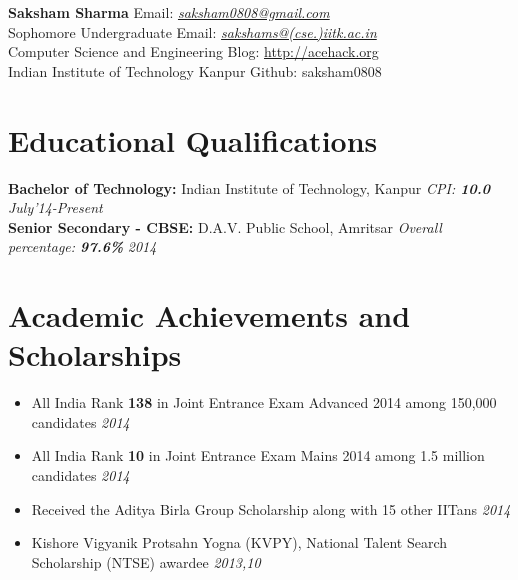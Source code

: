 \documentclass[11pt,a4paper]{article}
\begin{document}
\textbf{\huge{Saksham Sharma}} \hfill Email: \href{mailto:saksham0808@gmail.com}{\textit{saksham0808@gmail.com}}\\
Sophomore Undergraduate    \hfill  Email: \href{mailto:sakshams@cse.iitk.ac.in}{\textit{sakshams@(cse.)iitk.ac.in}}\\
Computer Science and Engineering      \hfill Blog: \url{http://acehack.org}\\
Indian Institute of Technology Kanpur \hfill Github: saksham0808

\vspace{-0.4cm}
\section*{Educational Qualifications}
\vspace{-0.2cm}
\textbf{\large{Bachelor of Technology:}} Indian Institute of Technology, Kanpur \emph{CPI: \textbf{10.0}} \hfill\textit{ July'14-Present}\\
\textbf{\large{Senior Secondary - CBSE:}} D.A.V. Public School, Amritsar \emph{Overall percentage: \textbf{97.6\%}} \hfill\textit{ 2014}


\vspace{-0.4cm}
\section*{Academic Achievements and Scholarships}
\vspace{-0.2cm}
\begin {itemize}
\item All India Rank \textbf{138} in Joint Entrance Exam Advanced 2014 among 150,000 candidates            	\hfill \textit{2014}
\item All India Rank \textbf{10} in Joint Entrance Exam Mains 2014 among 1.5 million candidates              \hfill \textit{2014}
\item Received the Aditya Birla Group Scholarship along with 15 other IITans                        \hfill \textit{2014}
\item Kishore Vigyanik Protsahn Yogna (KVPY), National Talent Search Scholarship (NTSE) awardee
      \hfill \textit{2013,10}
\end{itemize}

\vspace{-0.4cm}
\end{document}
